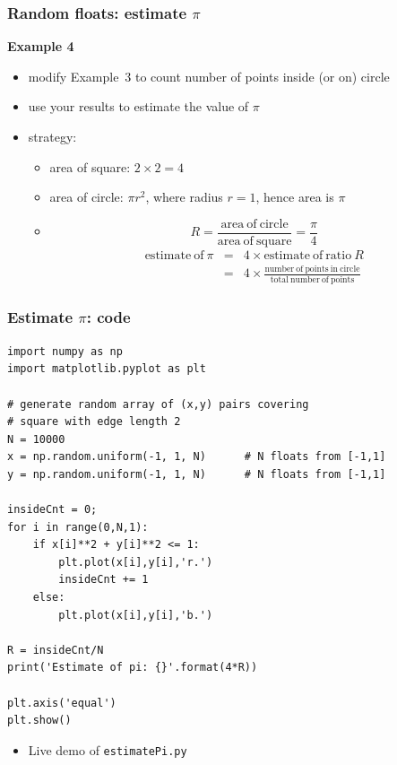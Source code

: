 \documentclass[english,14pt]{beamer}
\begin{document}

\begin{frame}[fragile]

\frametitle{Random floats: estimate $\pi$}

\textbf{Example 4}\\
\begin{itemize}
	\item modify Example~3 to count number of points inside (or on) circle
	\item use your results to estimate the value of $\pi$
	\pause
	\item strategy:
	\begin{itemize}
		\item area of square: $2 \times 2 = 4$
		\item area of circle: $\pi r^2$, where radius $r=1$, hence area is $\pi$
		\item[]
		\[
			R = \frac{\mathrm{area~of~circle}}{\mathrm{area~of~square}} = \frac{\pi}{4}
		\]
		\pause		
		\begin{eqnarray*}
			\mathrm{estimate~of~} \pi & = & 4\times \mathrm{estimate~of~ratio~} R \\
			& =& 4 \times \frac{\mathrm{number~of~points~in~circle}}{\mathrm{total~number~of~points}}
		\end{eqnarray*}
	\end{itemize}
\end{itemize}

\end{frame}


\begin{frame}[fragile]

\frametitle{Estimate $\pi$: code}
\vspace*{-5mm}
\begin{lstlisting}[style=CStyle,basicstyle=\scriptsize]
import numpy as np
import matplotlib.pyplot as plt

# generate random array of (x,y) pairs covering
# square with edge length 2
N = 10000
x = np.random.uniform(-1, 1, N)      # N floats from [-1,1]
y = np.random.uniform(-1, 1, N)      # N floats from [-1,1]

insideCnt = 0;
for i in range(0,N,1):
    if x[i]**2 + y[i]**2 <= 1:
        plt.plot(x[i],y[i],'r.')
        insideCnt += 1
    else:
        plt.plot(x[i],y[i],'b.')

R = insideCnt/N
print('Estimate of pi: {}'.format(4*R))

plt.axis('equal')
plt.show()
\end{lstlisting}
\vspace*{-3mm}
\begin{itemize}
	\item Live demo of \texttt{estimatePi.py}
\end{itemize}
\end{frame}
\end{document}
